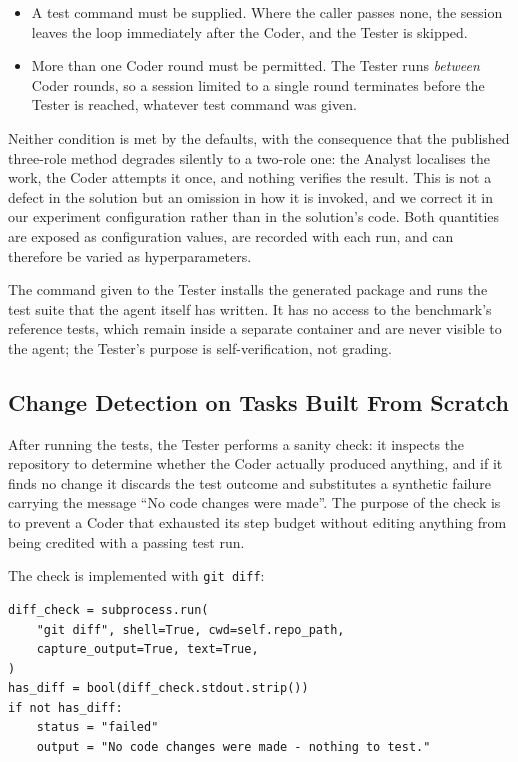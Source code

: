 \begin{itemize}
\item A test command must be supplied. Where the caller passes none, the
      session leaves the loop immediately after the Coder, and the Tester is
      skipped.
\item More than one Coder round must be permitted. The Tester runs
      \emph{between} Coder rounds, so a session limited to a single round
      terminates before the Tester is reached, whatever test command was given.
\end{itemize}

Neither condition is met by the defaults, with the consequence that the
published three-role method degrades silently to a two-role one: the Analyst
localises the work, the Coder attempts it once, and nothing verifies the
result. This is not a defect in the solution but an omission in how it is
invoked, and we correct it in our experiment configuration rather than in the
solution's code. Both quantities are exposed as configuration values, are
recorded with each run, and can therefore be varied as hyperparameters.

The command given to the Tester installs the generated package and runs the
test suite that the agent itself has written. It has no access to the
benchmark's reference tests, which remain inside a separate container and are
never visible to the agent; the Tester's purpose is self-verification, not
grading.

\subsection{Change Detection on Tasks Built From Scratch}

After running the tests, the Tester performs a sanity check: it inspects the
repository to determine whether the Coder actually produced anything, and if it
finds no change it discards the test outcome and substitutes a synthetic
failure carrying the message ``No code changes were made''. The purpose of the
check is to prevent a Coder that exhausted its step budget without editing
anything from being credited with a passing test run.

The check is implemented with \texttt{git diff}:

\begin{verbatim}
diff_check = subprocess.run(
    "git diff", shell=True, cwd=self.repo_path,
    capture_output=True, text=True,
)
has_diff = bool(diff_check.stdout.strip())
if not has_diff:
    status = "failed"
    output = "No code changes were made - nothing to test."
\end{verbatim}

